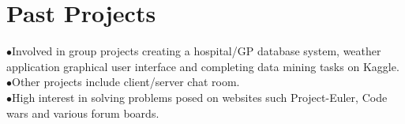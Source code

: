 \section*{Past Projects}

\noindent $\bullet$Involved in group projects creating a hospital/GP database system, weather application graphical user interface and completing data mining tasks on Kaggle. \\
$\bullet$Other projects include client/server chat room.  \\
$\bullet$High interest in solving problems posed on websites such Project-Euler, Code wars and various forum boards.   